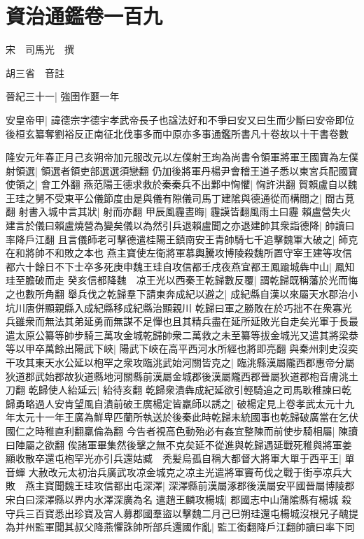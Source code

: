 \chapter{資治通鑑卷一百九}
宋　司馬光　撰

胡三省　音註

晉紀三十一|{
	強圉作噩一年}


安皇帝甲|{
	諱德宗字德宇孝武帝長子也諡法好和不爭曰安又曰生而少斷曰安帝即位後桓玄纂奪劉裕反正南征北伐事多而中原亦多事通鑑所書凡十卷故以十干書卷數}


隆安元年春正月己亥朔帝加元服改元以左僕射王珣為尚書令領軍將軍王國寶為左僕射領選|{
	領選者領吏部選選須戀翻}
仍加後將軍丹楊尹會稽王道子悉以東宮兵配國寶使領之|{
	會工外翻}
燕范陽王德求救於秦秦兵不出鄴中恟懼|{
	恟許洪翻}
賀賴盧自以魏王珪之舅不受東平公儀節度由是與儀有隙儀司馬丁建隂與德通從而構間之|{
	間古莧翻}
射書入城中言其狀|{
	射而亦翻}
甲辰風霾晝晦|{
	霾謨皆翻風雨土曰霾}
賴盧營失火建言於儀曰賴盧燒營為變矣儀以為然引兵退賴盧聞之亦退建帥其衆詣德降|{
	帥讀曰率降戶江翻}
且言儀師老可擊德遣桂陽王鎮南安王青帥騎七千追擊魏軍大破之|{
	師克在和將帥不和敗之本也}
燕主寶使左衛將軍慕輿騰攻博陵殺魏所置守宰王建等攻信都六十餘日不下士卒多死庚申魏王珪自攻信都壬戌夜燕宜都王鳳踰城犇中山|{
	鳳知珪至膽破而走}
癸亥信都降魏　凉王光以西秦王乾歸數反覆|{
	謂乾歸既稱藩於光而悔之也數所角翻}
舉兵伐之乾歸羣下請東奔成紀以避之|{
	成紀縣自漢以來屬天水郡治小坑川唐併顯親縣入成紀縣移成紀縣治顯親川}
乾歸曰軍之勝敗在於巧拙不在衆寡光兵雖衆而無法其弟延勇而無謀不足憚也且其精兵盡在延所延敗光自走矣光軍于長最遣太原公纂等帥步騎三萬攻金城乾歸帥衆二萬救之未至纂等拔金城光又遣其將梁㳟等以甲卒萬餘出陽武下峽|{
	陽武下峽在高平西河水所經也將即亮翻}
與秦州刺史沒奕干攻其東天水公延以枹罕之衆攻臨洮武始河關皆克之|{
	臨洮縣漢屬隴西郡惠帝分屬狄道郡武始郡故狄道縣地河關縣前漢屬金城郡後漢屬隴西郡晉屬狄道郡枹音膚洮土刀翻}
乾歸使人紿延云|{
	紿待亥翻}
乾歸衆潰犇成紀延欲引輕騎追之司馬耿稚諫曰乾歸勇略過人安肯望風自潰前破王廣楊定皆羸師以誘之|{
	破楊定見上卷孝武太元十九年太元十一年王廣為鮮卑匹蘭所執送於後秦此時乾歸未統國事也乾歸破廣當在乞伏國仁之時稚直利翻羸倫為翻}
今告者視高色動殆必有姦宜整陳而前使步騎相屬|{
	陳讀曰陣屬之欲翻}
俟諸軍畢集然後擊之無不克矣延不從進與乾歸遇延戰死稚與將軍姜顯收散卒還屯枹罕光亦引兵還姑臧　秃髪烏孤自稱大都督大將軍大單于西平王|{
	單音蟬}
大赦改元太初治兵廣武攻凉金城克之凉主光遣將軍竇苟伐之戰于街亭凉兵大敗　燕主寶聞魏王珪攻信都出屯深澤|{
	深澤縣前漢屬涿郡後漢屬安平國晉屬博陵郡宋白曰深澤縣以界内水澤深廣為名}
遣趙王麟攻楊城|{
	郡國志中山蒲隂縣有楊城}
殺守兵三百寶悉出珍寶及宫人募郡國羣盜以擊魏二月己巳朔珪還屯楊城沒根兄子醜提為并州監軍聞其叔父降燕懼誅帥所部兵還國作亂|{
	監工銜翻降戶江翻帥讀曰率下同}
